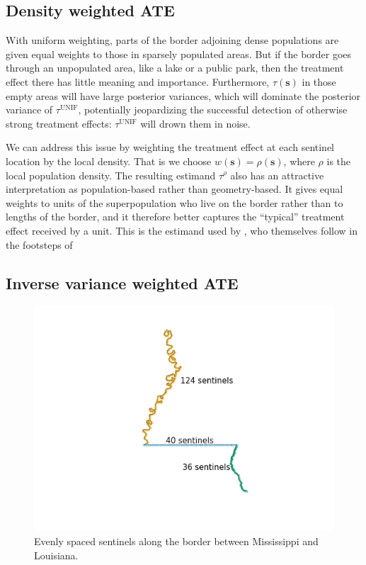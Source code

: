 \documentclass[letter]{article}
\makeatletter
\def\maxwidth{\ifdim\Gin@nat@width>\linewidth\linewidth
\else\Gin@nat@width\fi}
\let\Oldincludegraphics\includegraphics
\renewcommand{\includegraphics}[1]{\Oldincludegraphics[width=.8\maxwidth]{#1}}
\newcommand{\svec}{\mathbold{s}}
\newcommand{\unifavg}{\tau^{\mathrm{UNIF}}}
\newcommand{\taurho}{\tau^{\rho}}
\renewcommand{\cite}[1]{\citep{#1}}
\makeatother
\begin{document}
    	\subsection{Density weighted ATE}\label{density-weighted-ate}

With uniform weighting, parts of the border adjoining dense populations are given equal weights to those in sparsely populated areas.
But if the border goes through an unpopulated area, like a lake or a public park, then the treatment effect there has little meaning and importance.
Furthermore, \(\tau(\svec)\) in those empty areas will have large posterior variances, which will dominate the posterior variance of \(\unifavg\), potentially jeopardizing the successful detection of otherwise strong treatment effects: \(\unifavg\) will drown them in noise.

We can address this issue by weighting the treatment effect at each sentinel location by the local density.
That is we choose \(w(\svec) = \rho(\svec)\), where \(\rho\) is the local population density.
The resulting estimand \(\taurho\) also has an attractive interpretation as population-based rather than geometry-based.
It gives equal weights to units of the superpopulation who live on the border rather than to lengths of the border,
and it therefore better captures the ``typical'' treatment effect received by a unit.
This is the estimand used by \cite{keele_titiunik_2015}, who themselves follow in the footsteps of \cite{imbens2011regression}
    


    	\subsection{Inverse variance weighted ATE}\label{inverse-variance-weighted-ate}

\begin{figure}
\centering
\includegraphics{figures/mississippi_counts.png}
\caption{\label{fig:mississippi_counts} Evenly spaced sentinels along the border between Mississippi and Louisiana.}
\end{figure}
\end{document}
